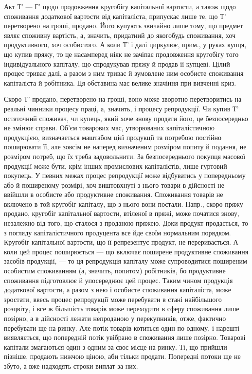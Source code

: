 Акт Т' — Г' щодо продовження кругобігу капітальної вартости, а
також щодо споживання додаткової вартости від капіталіста, припускає
лише те, що Т' перетворено на гроші, продано. Його купують звичайно
лише тому, що предмет являє споживну вартість, а, значить, придатний
до якогобудь споживання, хоч продуктивного, хоч особистого. А коли
Т' і далі циркулює, прим., у руках купця, що купив пряжу, то
це насамперед ніяк не зачіпає продовження кругобігу того індивідуального
капіталу, що спродукував пряжу й продав її купцеві. Цілий процес
триває далі, а разом з ним триває й зумовлене ним особисте споживання
капіталіста й робітника. Ця обставина має велике значіння при вивченні
криз.

Скоро Т' продано, перетворено на гроші, воно може зворотно перетворитись
на реальні чинники процесу праці, а, значить, і процесу репродукції.
Чи купив Т' остаточний споживач, чи купець, який хоче знову продати
його, це безпосередньо не змінює справи. Об’єм товарових мас, утворюваних
капіталістичною продукцією, визначається маштабом цієї продукції
та потребою постійно поширювати її, але зовсім не наперед визначеним
розміром попиту й подання, не розміром потреб, що їх треба задовольнити.
За безпосереднього покупця масової продукції може бути, крім
інших промислових капіталістів, лише гуртовий покупець. У певних
межах процес репродукції може відбуватись у попередньому або й
поширеному розмірі, хоч виштовхнуті з нього товари в дійсності не
ввійшли в особисте або продуктивне споживання. Споживання товарів не
включено в той кругобіг капіталу, що з нього вони постали. Напр.,
скоро пряжу продано, кругобіг капітальної вартости, втіленої в пряжі,
може початися знову, незалежно від того, що сталося з проданою пряжею.
Доки продукт продається, то з погляду капіталістичного продуцента
все йде своїм нормальним порядком. Кругобіг капітальної вартости, що
її репрезентує продукт, не переривається. А коли цей процес поширюється
— що включає поширене продуктивне споживання засобів продукції,
— то ця репродукція капіталу може супроводитися поширеним
особистим споживанням (а, значить, попитом) робітників, бо продуктивне
споживання підготовлює й упосереднює цей процес. Таким
чином продукція додаткової вартости, а разом з нею і особисте
споживання капіталіста, може зростати, ввесь процес репродукції може
перебувати в стані найбільшого розцвіту, і все ж більшість товарів
може переходити в сферу споживання лише позірно, а в
дійсності лежати непроданою у перекупників, отже, фактично перебувати
ще на ринку. Але потік товарів котиться один по одному, і нарешті
виявляється, що попередній потік увібрано в споживання лише позірно.
Товарові капітали змагаються один з одним за своє місце на ринку. Ті,
що прийшли пізніше, продають нижчою ціною, аби тільки продати.
Попередні потоки ще не збуто, а вже надходять строки виплат за них.
\parbreak{}  %

